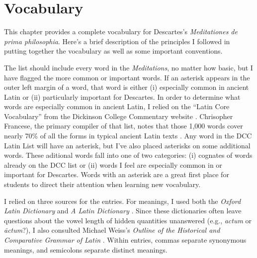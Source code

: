 \chapter{Vocabulary}

This chapter provides a complete vocabulary for Descartes's \textit{Meditationes de prima philosophia}. Here's a brief description of the principles I followed in putting together the vocabulary as well as some important conventions.

The list should include every word in the \textit{Meditations}, no matter how basic, but I have flagged the more common or important words. If an asterisk appears in the outer left margin of a word, that word is either (i) especially common in ancient Latin or (ii) particularly important for Descartes. In order to determine what words are especially common in ancient Latin, I relied on the ``Latin Core Vocabulary'' from the Dickinson College Commentary website \parencite{cfrancese2014}. Chrisopher Francese, the primary compiler of that list, notes that those 1,000 words cover nearly 70\% of all the forms in typical ancient Latin texts \parencite{cfrancese2013}. Any word in the DCC Latin List will have an asterisk, but I've also placed asterisks on some additional words. These aditional words fall into one of two categories: (i) cognates of words already on the DCC list or (ii) words I feel are especially common in or important for Descartes. Words with an asterisk are a great first place for students to direct their attention when learning new vocabulary.

I relied on three sources for the entries. For meanings, I used both the \textit{Oxford Latin Dictionary} and \textit{A Latin Dictionary} \parencite{old1982,lewisshort}. Since these dictionaries often leave questions about the vowel length of hidden quantities unanswered (e.g., \textit{actum} or \textit{āctum}?), I also consulted Michael Weiss's \textit{Outline of the Historical and Comparative Grammar of Latin} \parencite{weiss2011}. Within entries, commas separate synonymous meanings, and semicolons separate distinct meanings.
\clearpage

